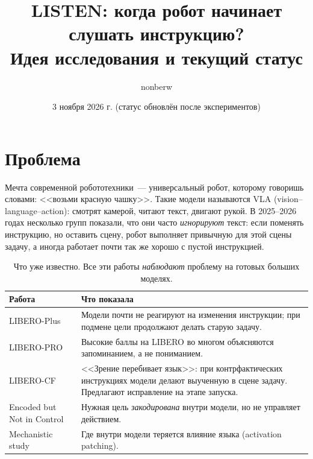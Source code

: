 \documentclass[11pt]{article}
\title{\textbf{LISTEN: когда робот начинает слушать инструкцию?}\\[0.3em]
\large Идея исследования и текущий статус}
\author{nonberw}
\date{3 ноября 2026 г. (статус обновлён после экспериментов)}
\begin{document}
\maketitle

\begin{center}
\end{center}

\section{Проблема}

Мечта современной робототехники~--- универсальный робот, которому говоришь словами: <<возьми
красную чашку>>. Такие модели называются VLA (vision--language--action): смотрят камерой, читают
текст, двигают рукой. В 2025--2026 годах несколько групп показали, что они часто \emph{игнорируют}
текст: если поменять инструкцию, но оставить сцену, робот выполняет привычную для этой сцены
задачу, а иногда работает почти так же хорошо с пустой инструкцией.

\begin{table}[h]
\centering\small
\begin{tabular}{p{4.4cm}p{10.6cm}}
\toprule
Работа & Что показала \\
\midrule
LIBERO-Plus~\citep{fei2025liberoplus} & Модели почти не реагируют на изменения инструкции; при подмене цели продолжают делать старую задачу. \\
LIBERO-PRO~\citep{zhou2025liberopro} & Высокие баллы на LIBERO во многом объясняются запоминанием, а не пониманием. \\
LIBERO-CF~\citep{fang2026vision} & <<Зрение перебивает язык>>: при контрфактических инструкциях модели делают выученную в сцене задачу. Предлагают исправление на этапе запуска. \\
Encoded but Not in Control~\citep{jiang2026encoded} & Нужная цель \emph{закодирована} внутри модели, но не управляет действием. \\
Mechanistic study~\citep{wulff2026mechanistic} & Где внутри модели теряется влияние языка (activation patching). \\
\bottomrule
\end{tabular}
\caption{Что уже известно. Все эти работы \emph{наблюдают} проблему на готовых больших моделях.}
\end{table}
\end{document}
